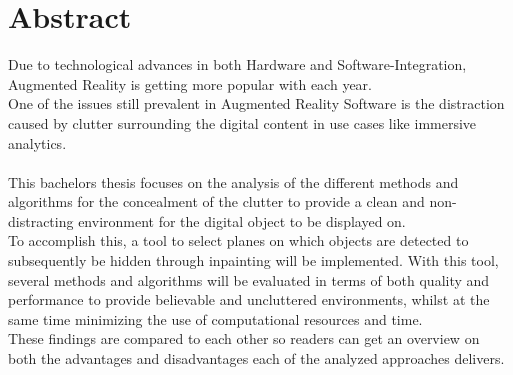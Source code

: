 \chapter{Abstract}

Due to technological advances in both Hardware and Software-Integration, Augmented Reality is getting more popular with each year. 
\\
One of the issues still prevalent in Augmented Reality Software is the distraction caused by clutter surrounding the digital content in use cases like immersive analytics.  
\\\\
This bachelors thesis focuses on the analysis of the different methods and algorithms for the concealment of the clutter to provide a clean and non-distracting environment for the digital object to be displayed on. 
\\
To accomplish this, a tool to select planes on which objects are detected to subsequently be hidden through inpainting will be implemented. With this tool, several methods and algorithms will be evaluated in terms of both quality and performance to provide believable and uncluttered environments, whilst at the same time minimizing the use of computational resources and time.
\\ 
These findings are compared to each other so readers can get an overview on both the advantages and disadvantages each of the analyzed approaches delivers.
